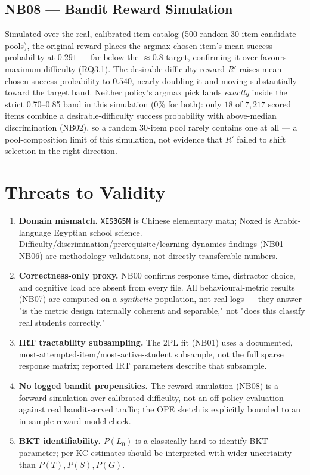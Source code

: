 \documentclass[11pt]{article}
\begin{document}
\subsection{NB08 --- Bandit Reward Simulation}
Simulated over the real, calibrated item catalog (500 random 30-item candidate pools), the original reward places the argmax-chosen item's mean success probability at $0.291$ --- far below the $\approx0.8$ target, confirming it over-favours maximum difficulty (RQ3.1). The desirable-difficulty reward $R'$ raises mean chosen success probability to $0.540$, nearly doubling it and moving substantially toward the target band. Neither policy's argmax pick lands \emph{exactly} inside the strict 0.70--0.85 band in this simulation ($0\%$ for both): only $18$ of $7{,}217$ scored items combine a desirable-difficulty success probability with above-median discrimination (NB02), so a random 30-item pool rarely contains one at all --- a pool-composition limit of this simulation, not evidence that $R'$ failed to shift selection in the right direction.

\section{Threats to Validity}\label{sec:threats}
\begin{enumerate}[leftmargin=1.4em]
\item \textbf{Domain mismatch.} \texttt{XES3G5M} is Chinese elementary math; Noxed is Arabic-language Egyptian school science. Difficulty/discrimination/prerequisite/learning-dynamics findings (NB01--NB06) are methodology validations, not directly transferable numbers.
\item \textbf{Correctness-only proxy.} NB00 confirms response time, distractor choice, and cognitive load are absent from every file. All behavioural-metric results (NB07) are computed on a \emph{synthetic} population, not real logs --- they answer "is the metric design internally coherent and separable," not "does this classify real students correctly."
\item \textbf{IRT tractability subsampling.} The 2PL fit (NB01) uses a documented, most-attempted-item/most-active-student subsample, not the full sparse response matrix; reported IRT parameters describe that subsample.
\item \textbf{No logged bandit propensities.} The reward simulation (NB08) is a forward simulation over calibrated difficulty, not an off-policy evaluation against real bandit-served traffic; the OPE sketch is explicitly bounded to an in-sample reward-model check.
\item \textbf{BKT identifiability.} $P(L_0)$ is a classically hard-to-identify BKT parameter; per-KC estimates should be interpreted with wider uncertainty than $P(T),P(S),P(G)$.
\end{enumerate}
\end{document}
